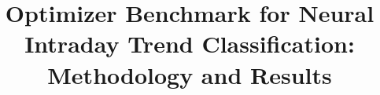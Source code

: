 \documentclass[sn-mathphys-num,Numbered]{sn-jnl}
\begin{document}
\title{Optimizer Benchmark for Neural Intraday Trend Classification: Methodology and Results}
\maketitle

\newcommand{\methodresultscompact}{}




\end{document}
